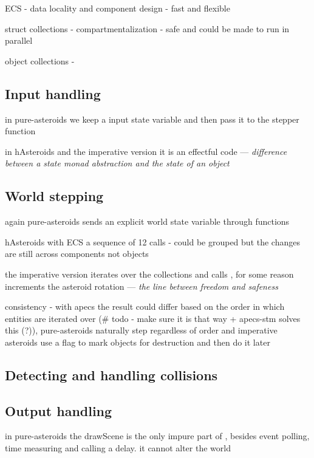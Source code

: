 \documentclass[
  digital, %
  color,   %
  table,   %
  oneside, %
  lof,     %
  lot,     %
]{fithesis3}
\begin{document}
{ECS - data locality and component design - fast and flexible

struct collections - compartmentalization - safe and could be made to run in parallel

object collections - 

\subsection{Input handling}

in pure-asteroids we keep a input state variable and then pass it to the stepper function

in hAsteroids and the imperative version it is an effectful code
--- \emph{difference between a state monad abstraction and the state of an object}

\subsection{World stepping}

again pure-asteroids sends an explicit world state variable through functions

hAsteroids with ECS a sequence of 12 calls - could be grouped but the
changes are still across components not objects

the imperative version iterates over the collections and calls ,
for some reason  increments the asteroid rotation
--- \emph{the line between freedom and safeness}

consistency - with apecs the result could differ based on the order in which
entities are iterated over (\# todo - make sure it is that way + apecs-stm solves this (?)),
pure-asteroids naturally step regardless of order and imperative asteroids use a flag to mark
objects for destruction and then do it later

\subsection{Detecting and handling collisions}



\subsection{Output handling}

in pure-asteroids the drawScene is the only impure part of ,
besides event polling, time measuring and calling a delay. it cannot alter the world

}
\end{document}
